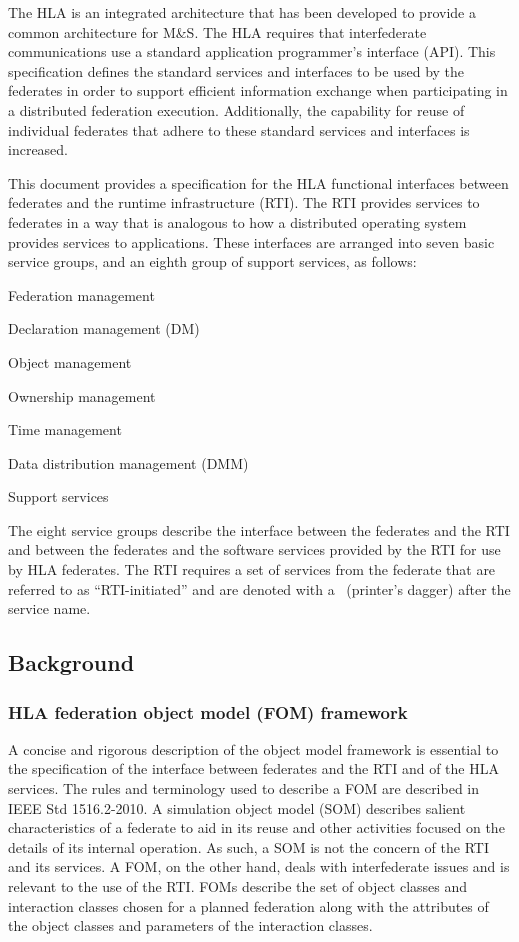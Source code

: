 The HLA is an integrated architecture that has been developed to provide a common architecture for M\&S. The HLA requires that interfederate communications use a standard application programmer's interface (API). This specification defines the standard services and interfaces to be used by the federates in order to support efficient information exchange when participating in a distributed federation execution. Additionally, the capability for reuse of individual federates that adhere to these standard services and interfaces is increased.

This document provides a specification for the HLA functional interfaces between federates and the runtime infrastructure (RTI). The RTI provides services to federates in a way that is analogous to how a distributed operating system provides services to applications. These interfaces are arranged into seven basic service groups, and an eighth group of support services, as follows:

\begin{stdalphalist}
    \item Federation management
    \item Declaration management (DM)
    \item Object management
    \item Ownership management
    \item Time management
    \item Data distribution management (DMM)
    \item Support services
\end{stdalphalist}

The eight service groups describe the interface between the federates and the RTI and between the federates and the software services provided by the RTI for use by HLA federates. The RTI requires a set of services from the federate that are referred to as ``RTI-initiated'' and are denoted with a \rtiinitiated\ (printer's dagger) after the service name.

\subsection{Background}

\subsubsection{HLA federation object model (FOM) framework}

A concise and rigorous description of the object model framework is essential to the specification of the interface between federates and the RTI and of the HLA services. The rules and terminology used to describe a FOM are described in IEEE Std 1516.2-2010. A simulation object model (SOM) describes salient characteristics of a federate to aid in its reuse and other activities focused on the details of its internal operation. As such, a SOM is not the concern of the RTI and its services. A FOM, on the other hand, deals with interfederate issues and is relevant to the use of the RTI. FOMs describe the set of object classes and interaction classes chosen for a planned federation along with the attributes of the object classes and parameters of the interaction classes.

